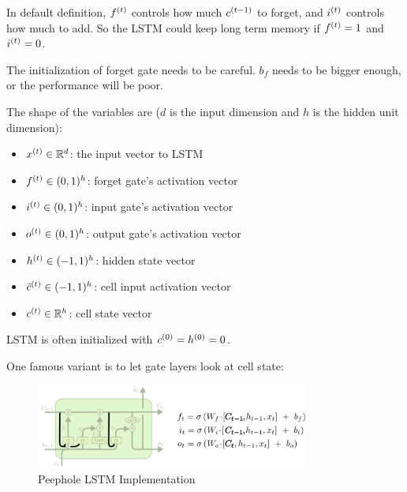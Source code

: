 In default definition, ${f}^{(t)}$ controls how much ${c}^{(t-1)}$ to forget, and ${i}^{(t)}$ controls how much to add. So the LSTM could keep long term memory if ${f}^{(t)} = 1$ and ${i}^{(t)} = 0$.

The initialization of forget gate needs to be careful. $b_f$ needs to be bigger enough, or the performance will be poor.

The shape of the variables are ($d$ is the input dimension and $h$ is the hidden unit dimension):
\begin{itemize}
    \item ${x}^{(t)} \in \mathbb{R}^d$: the input vector to LSTM
    \item ${f}^{(t)} \in (0,1)^h$: forget gate's activation vector
    \item ${i}^{(t)} \in (0,1)^h$: input gate's activation vector
    \item ${o}^{(t)} \in (0,1)^h$: output gate's activation vector
    \item ${h}^{(t)} \in (-1,1)^h$: hidden state vector
    \item ${\tilde{c}}^{(t)} \in (-1,1)^h$: cell input activation vector
    \item ${c}^{(t)} \in \mathbb{R}^h$: cell state vector
\end{itemize}

LSTM is often initialized with ${c}^{(0)} = {h}^{(0)} = 0$.



\begin{definition}
    One famous variant is to let gate layers look at cell state:
    \begin{figure}[H]
\includegraphics[width=0.8\textwidth]{machine_learning/pic/04/LSTM3-var-peepholes.png}
\centering
\caption{Peephole LSTM Implementation}
\end{figure}
\end{definition}

